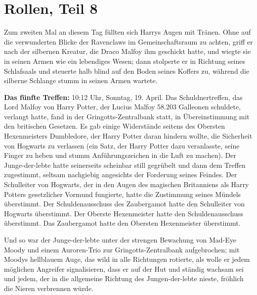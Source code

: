 \chapter{Rollen, Teil 8}

Zum zweiten Mal an diesem Tag füllten sich Harrys Augen mit Tränen. Ohne auf die
verwunderten Blicke der Ravenclaws im Gemeinschaftsraum zu achten, griff er nach
der silbernen Kreatur, die Draco Malfoy ihm geschickt hatte, und wiegte sie in
seinen Armen wie ein lebendiges Wesen; dann stolperte er in Richtung seines
Schlafsaals und steuerte halb blind auf den Boden seines Koffers zu, während die
silberne Schlange stumm in seinen Armen wartete.

\textbf{Das fünfte Treffen: }10:12 Uhr, Sonntag, 19. April. Das
Schuldnertreffen, das Lord Malfoy von Harry Potter, der Lucius Malfoy 58.203
Galleonen schuldete, verlangt hatte, fand in der Gringotts-Zentralbank statt, in
Übereinstimmung mit den britischen Gesetzen. Es gab einige Widerstände seitens
des Obersten Hexenmeisters Dumbledore, der Harry Potter daran hindern wollte,
die Sicherheit von Hogwarts zu verlassen (ein Satz, der Harry Potter dazu
veranlasste, seine Finger zu heben und stumm Anführungszeichen in die Luft zu
machen). Der Junge-der-lebte hatte seinerseits scheinbar still gegrübelt und
dann dem Treffen zugestimmt, seltsam nachgiebig angesichts der Forderung seines
Feindes. Der Schulleiter von Hogwarts, der in den Augen des magischen
Britanniens als Harry Potters gesetzlicher Vormund fungierte, hatte die
Zustimmung seines Mündels überstimmt. Der Schuldenausschuss des Zaubergamot
hatte den Schulleiter von Hogwarts überstimmt. Der Oberste Hexenmeister hatte
den Schuldenausschuss überstimmt. Das Zaubergamot hatte den Obersten
Hexenmeister überstimmt.

Und so war der Junge-der-lebte unter der strengen Bewachung von Mad-Eye Moody
und einem Auroren-Trio zur Gringotts-Zentralbank aufgebrochen; mit Moodys
hellblauem Auge, das wild in alle Richtungen rotierte, als wolle er jedem
möglichen Angreifer signalisieren, dass er auf der Hut und ständig wachsam sei
und jedem, der in die allgemeine Richtung des Jungen-der-lebte nieste, fröhlich
die Nieren verbrennen würde.

